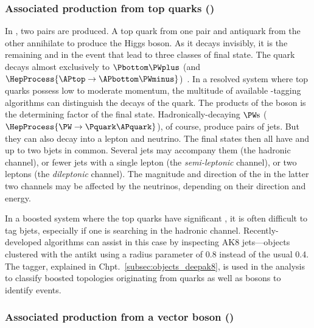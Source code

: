 

\subsubsection{Associated production from top quarks (\texorpdfstring{\ttH}{ttH})}
\label{subsubsec:theory_hinv_ttH_mode}

In \ttH, two \ttbar pairs are produced. A top quark \Ptop from one pair and antiquark \APtop from the other annihilate to produce the Higgs boson. As it decays invisibly, it is the remaining \Ptop and \APtop in the event that lead to three classes of final state. The \Ptop quark decays almost exclusively to $\Pbottom\PWplus$ (and $\HepProcess{\APtop \to \APbottom\PWminus}$)~\cite{PhysRevD.98.030001}. In a resolved system where top quarks possess low to moderate momentum, the multitude of available \Pbottom-tagging algorithms can distinguish the decays of the \Pbottom quark. The products of the \PW boson is the determining factor of the final state. Hadronically-decaying $\PW\text{s}$ ($\HepProcess{\PW \to \Pquark\APquark}$), of course, produce pairs of \glspl{jet}. But they can also decay into a lepton and neutrino. The final states then all have \ptmiss and up to two \glspl{bjet} in common. Several \glspl{jet} may accompany them (the hadronic channel), or fewer \glspl{jet} with a single lepton (the \emph{semi-leptonic} channel), or two leptons (the \emph{dileptonic} channel). The magnitude and direction of the \ptmiss in the latter two channels may be affected by the neutrinos, depending on their direction and energy.

In a boosted system where the top quarks have significant \pt, it is often difficult to tag \glspl{bjet}, especially if one is searching in the hadronic channel. Recently-developed algorithms can assist in this case by inspecting AK8 \glspl{jet}---objects clustered with the \gls{antikt} using a radius parameter of 0.8 instead of the usual 0.4. The \deepakeight tagger, explained in Chpt.~\ref{subsec:objects_deepak8}, is used in the analysis to classify boosted topologies originating from \Ptop quarks as well as \PVec bosons to identify \ttH events.




\subsubsection{Associated production from a vector boson (\texorpdfstring{\VH}{VH})}
\label{subsubsec:theory_hinv_VH_mode}

